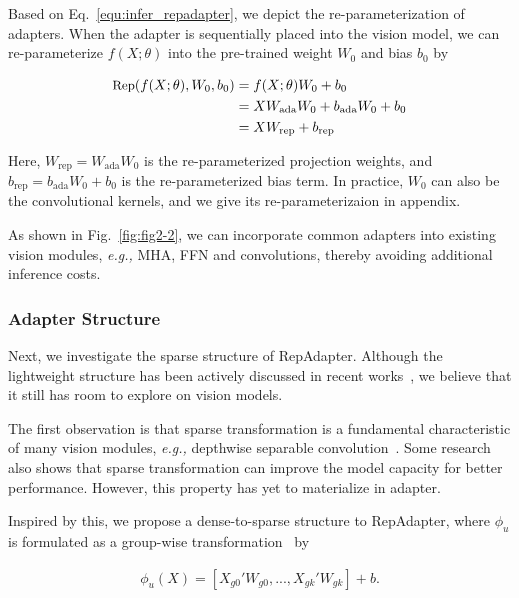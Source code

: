  Based on Eq.~\ref{equ:infer_repadapter}, we  depict the re-parameterization of adapters.  When the adapter is sequentially placed into the vision model, we can  re-parameterize $f(X;\theta)$  into  the pre-trained weight $W_0$ and  bias $b_0$ by

\begin{equation}
\label{equ:rep_ffn}
\begin{aligned}
\small
\text{Rep}(f(X;\theta),W_0,b_0)&=f(X;\theta)W_0+b_0\\
 &=XW_{\text{ada}}W_0+b_{\text{ada}}W_0+b_0\\
 &=XW_{\text{rep}}+b_{\text{rep}}
\end{aligned}
\end{equation}

Here, $W_{\text{rep}}=W_{\text{ada}}W_0$ is the re-parameterized projection weights, and $b_{\text{rep}}=b_{\text{ada}}W_0+b_0$ is the re-parameterized bias term.  In practice, $W_0$ can also be the convolutional kernels, and we give its re-parameterizaion in appendix.   

As shown in Fig.~\ref{fig:fig2-2}, we  can incorporate  common adapters into  existing vision modules, \emph{e.g.,} MHA, FFN and convolutions, thereby avoiding additional inference costs.

\subsubsection{Adapter Structure }    Next, we investigate the sparse structure  of RepAdapter. Although the lightweight structure has been actively discussed in recent works~\cite{adapter,adaptformer,noah,ssf}, we believe that it still has room to explore on vision models. 

The first observation is that sparse transformation is a fundamental  characteristic  of many  vision modules, \emph{e.g.,} depthwise separable convolution~\cite{mobilenets}.  Some  research~\cite{resnext} also shows that sparse transformation can improve the model capacity  for better performance.  However,  this property has yet to materialize in adapter. 

Inspired by this, we propose a dense-to-sparse structure to RepAdapter, where  $\phi_u$ is formulated as a group-wise transformation~\cite{lwtrans} by

\begin{equation}
\label{equ:glinear}
\begin{aligned}
\phi_u(X)=[X_{g0}'W_{g0},...,X_{gk}'W_{gk}] + b.
\end{aligned}
\end{equation}

